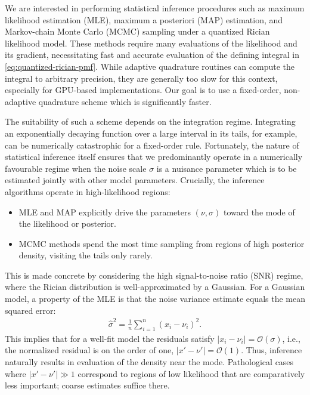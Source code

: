 \documentclass{article}
\begin{document}
We are interested in performing statistical inference procedures such as maximum likelihood estimation (MLE), maximum a posteriori (MAP) estimation, and Markov-chain Monte Carlo (MCMC) sampling under a quantized Rician likelihood model.
These methods require many evaluations of the likelihood and its gradient, necessitating fast and accurate evaluation of the defining integral in \cref{eq:quantized-rician-pmf}.
While adaptive quadrature routines can compute the integral to arbitrary precision, they are generally too slow for this context, especially for GPU-based implementations.
Our goal is to use a fixed-order, non-adaptive quadrature scheme which is significantly faster.

The suitability of such a scheme depends on the integration regime.
Integrating an exponentially decaying function over a large interval in its tails, for example, can be numerically catastrophic for a fixed-order rule.
Fortunately, the nature of statistical inference itself ensures that we predominantly operate in a numerically favourable regime when the noise scale $\sigma$ is a nuisance parameter which is to be estimated jointly with other model parameters.
Crucially, the inference algorithms operate in high-likelihood regions:
%
\begin{itemize}
  \item MLE and MAP explicitly drive the parameters $(\nu,\sigma)$ toward the mode of the likelihood or posterior.
  \item MCMC methods spend the most time sampling from regions of high posterior density, visiting the tails only rarely.
\end{itemize}
%
This is made concrete by considering the high signal-to-noise ratio (SNR) regime, where the Rician distribution is well-approximated by a Gaussian.
For a Gaussian model, a property of the MLE is that the noise variance estimate equals the mean squared error:
%
\begin{align}
  \hat{\sigma}^2 = \frac{1}{n} \sum_{i=1}^n (x_i - \nu_i)^2.
\end{align}
%
This implies that for a well-fit model the residuals satisfy $|x_i - \nu_i| = \mathcal{O}(\sigma)$, i.e., the normalized residual is on the order of one, $|x' - \nu'| = \mathcal{O}(1)$.
Thus, inference naturally results in evaluation of the density near the mode.
Pathological cases where $|x'-\nu'| \gg 1$ correspond to regions of low likelihood that are comparatively less important;
coarse estimates suffice there.
\end{document}

